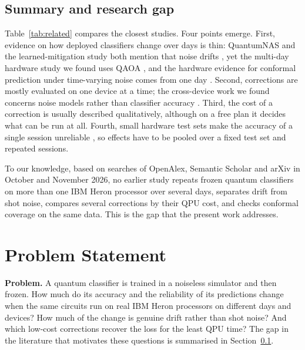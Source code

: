 \documentclass[10pt,conference]{IEEEtran}
\begin{document}
\subsection{Summary and research gap}
\label{sec:gap}
Table~\ref{tab:related} compares the closest studies. Four points emerge. First, evidence on how
deployed classifiers change over days is thin: QuantumNAS and the learned-mitigation study both
mention that noise drifts \cite{wang2022quantumnas,liao2024mlqem}, yet the multi-day hardware
study we found uses QAOA \cite{qaoa2026drift}, and the hardware evidence for conformal
prediction under time-varying noise comes from one day \cite{spencer2026aqcp}. Second,
corrections are mostly evaluated on one device at a time; the cross-device work we found
concerns noise models rather than classifier accuracy \cite{farib2026crossdevice}. Third, the
cost of a correction is usually described qualitatively, although on a free plan it decides what
can be run at all. Fourth, small hardware test sets make the accuracy of a single session
unreliable \cite{qbiobench2026}, so effects have to be pooled over a fixed test set and
repeated sessions.

To our knowledge, based on searches of OpenAlex, Semantic Scholar and arXiv in October and
November 2026, no earlier study repeats frozen quantum classifiers on more than one IBM Heron
processor over several days, separates drift from shot noise, compares several corrections by
their QPU cost, and checks conformal coverage on the same data. This is the gap that the
present work addresses.

\section{Problem Statement}
\label{sec:problem}

\textbf{Problem.} A quantum classifier is trained in a noiseless simulator and then frozen. How
much do its accuracy and the reliability of its predictions change when the same circuits run
on real IBM Heron processors on different days and devices? How much of the change is genuine
drift rather than shot noise? And which low-cost corrections recover the loss for the least QPU
time? The gap in the literature that motivates these questions is summarised in
Section~\ref{sec:gap}.
\end{document}

